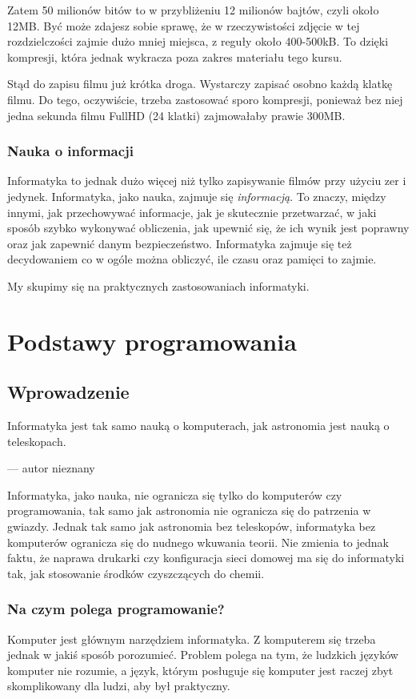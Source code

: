 \documentclass[11pt]{book}
\begin{document}
Zatem 50 milionów bitów to w przybliżeniu 12 milionów bajtów, czyli około 12MB.
Być może zdajesz sobie sprawę, że w rzeczywistości zdjęcie w tej rozdzielczości
zajmie dużo mniej miejsca, z reguły około 400-500kB. To dzięki kompresji, która
jednak wykracza poza zakres materiału tego kursu.

Stąd do zapisu filmu już krótka droga. Wystarczy zapisać osobno każdą klatkę
filmu. Do tego, oczywiście, trzeba zastosować sporo kompresji, ponieważ bez
niej jedna sekunda filmu FullHD (24 klatki) zajmowałaby prawie 300MB.

\section{Nauka o informacji}
Informatyka to jednak dużo więcej niż tylko zapisywanie filmów przy użyciu
zer i jedynek. Informatyka, jako nauka, zajmuje się \textit{informacją}.
To znaczy, między innymi, jak przechowywać informacje, jak je skutecznie
przetwarzać, w jaki sposób szybko wykonywać obliczenia, jak upewnić się, że
ich wynik jest poprawny oraz jak zapewnić danym bezpieczeństwo. Informatyka 
zajmuje się też decydowaniem co w ogóle można obliczyć, ile czasu oraz pamięci 
to zajmie.

My skupimy się na praktycznych zastosowaniach informatyki.

\part{Podstawy programowania}
\chapter{Wprowadzenie}
\epigraph%
{Informatyka jest tak samo nauką o komputerach, jak astronomia jest nauką
o teleskopach.}%
{--- autor nieznany}

Informatyka, jako nauka, nie ogranicza się tylko do komputerów czy
programowania, tak samo jak astronomia nie ogranicza się do patrzenia w gwiazdy.
Jednak tak samo jak astronomia bez teleskopów, informatyka bez komputerów
ogranicza się do nudnego wkuwania teorii. Nie zmienia to jednak faktu, że
naprawa drukarki czy konfiguracja sieci domowej ma się do informatyki tak,
jak stosowanie środków czyszczących do chemii.

\section{Na czym polega programowanie?}
Komputer jest głównym narzędziem informatyka. Z komputerem się trzeba jednak
w jakiś sposób porozumieć. Problem polega na tym, że ludzkich języków komputer
nie rozumie, a język, którym posługuje się komputer jest raczej zbyt
skomplikowany dla ludzi, aby był praktyczny.
\end{document}
